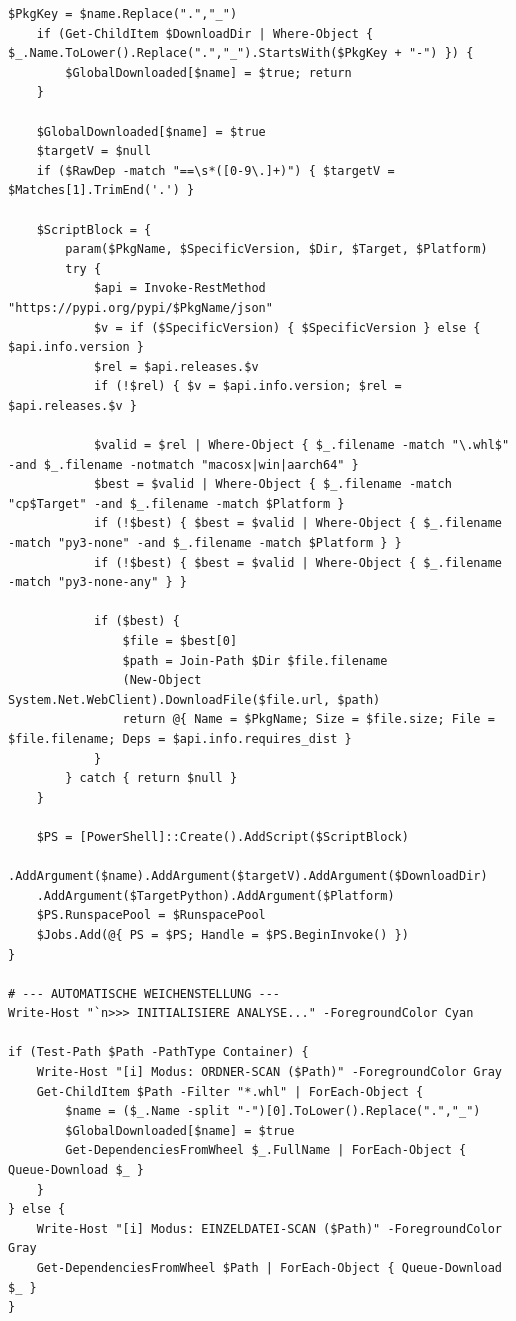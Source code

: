 \begin{lstlisting}[caption=Vollständiges Powershell-Skript zum Download von Wheel-Dateien, label=lst:powershell]
    $PkgKey = $name.Replace(".","_")
    if (Get-ChildItem $DownloadDir | Where-Object { $_.Name.ToLower().Replace(".","_").StartsWith($PkgKey + "-") }) {
        $GlobalDownloaded[$name] = $true; return
    }

    $GlobalDownloaded[$name] = $true
    $targetV = $null
    if ($RawDep -match "==\s*([0-9\.]+)") { $targetV = $Matches[1].TrimEnd('.') }

    $ScriptBlock = {
        param($PkgName, $SpecificVersion, $Dir, $Target, $Platform)
        try {
            $api = Invoke-RestMethod "https://pypi.org/pypi/$PkgName/json"
            $v = if ($SpecificVersion) { $SpecificVersion } else { $api.info.version }
            $rel = $api.releases.$v
            if (!$rel) { $v = $api.info.version; $rel = $api.releases.$v }

            $valid = $rel | Where-Object { $_.filename -match "\.whl$" -and $_.filename -notmatch "macosx|win|aarch64" }
            $best = $valid | Where-Object { $_.filename -match "cp$Target" -and $_.filename -match $Platform }
            if (!$best) { $best = $valid | Where-Object { $_.filename -match "py3-none" -and $_.filename -match $Platform } }
            if (!$best) { $best = $valid | Where-Object { $_.filename -match "py3-none-any" } }

            if ($best) {
                $file = $best[0]
                $path = Join-Path $Dir $file.filename
                (New-Object System.Net.WebClient).DownloadFile($file.url, $path)
                return @{ Name = $PkgName; Size = $file.size; File = $file.filename; Deps = $api.info.requires_dist }
            }
        } catch { return $null }
    }

    $PS = [PowerShell]::Create().AddScript($ScriptBlock)
    .AddArgument($name).AddArgument($targetV).AddArgument($DownloadDir)
    .AddArgument($TargetPython).AddArgument($Platform)
    $PS.RunspacePool = $RunspacePool
    $Jobs.Add(@{ PS = $PS; Handle = $PS.BeginInvoke() })
}

# --- AUTOMATISCHE WEICHENSTELLUNG ---
Write-Host "`n>>> INITIALISIERE ANALYSE..." -ForegroundColor Cyan

if (Test-Path $Path -PathType Container) {
    Write-Host "[i] Modus: ORDNER-SCAN ($Path)" -ForegroundColor Gray
    Get-ChildItem $Path -Filter "*.whl" | ForEach-Object {
        $name = ($_.Name -split "-")[0].ToLower().Replace(".","_")
        $GlobalDownloaded[$name] = $true
        Get-DependenciesFromWheel $_.FullName | ForEach-Object { Queue-Download $_ }
    }
} else {
    Write-Host "[i] Modus: EINZELDATEI-SCAN ($Path)" -ForegroundColor Gray
    Get-DependenciesFromWheel $Path | ForEach-Object { Queue-Download $_ }
}


\end{lstlisting}
